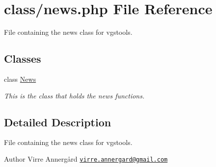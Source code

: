 \hypertarget{news_8php}{}\section{class/news.php File Reference}
\label{news_8php}


File containing the news class for vgstools.  


\subsection*{Classes}
\begin{DoxyCompactItemize}
\item 
class \hyperlink{class_news}{News}
\begin{DoxyCompactList}\small\item\em This is the class that holds the news functions. \end{DoxyCompactList}\end{DoxyCompactItemize}


\subsection{Detailed Description}
File containing the news class for vgstools. 

\begin{DoxyAuthor}{Author}
Virre Annergård \href{mailto:virre.annergard@gmail.com}{\tt virre.\+annergard@gmail.\+com} 
\end{DoxyAuthor}
